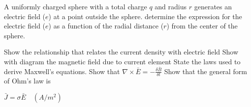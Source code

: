 \begin{mdframed}[backgroundcolor=lightblue, linewidth=1pt, hidealllines=true]
\begin{ExerciseList}
\Exercise[label={ex4}] A uniformly charged sphere with a total charge \(q\) and radius \(r\) generates an electric field (\(e\)) at a point outside the sphere. determine the expression for the electric field (\(e\)) as a function of the radial distance (\(r\)) from the center of the sphere.

\Exercise[label={ex6}] Show the relationship that relates the current density with electric field
\Exercise[label={ex7}] Show with diagram the magnetic field due to current element 
\Exercise[label={ex8}] State the laws used to derive Maxwell's equations.
\Exercise[label={ex9}] Show that $\nabla \times \bar{E} = -\frac{\delta \bar{B}}{\delta t}$
\Exercise[label={ex10}] Show that the general form of Ohm's law is 

$\bar{J} = \sigma\bar{E}\quad (A/m^{2})$


\end{ExerciseList}
\end{mdframed}

